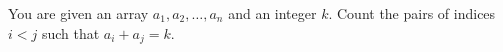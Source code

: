 You are given an array $a_1, a_2, \ldots, a_n$ and an integer $k$.
Count the pairs of indices $i < j$ such that $a_i + a_j = k$.
